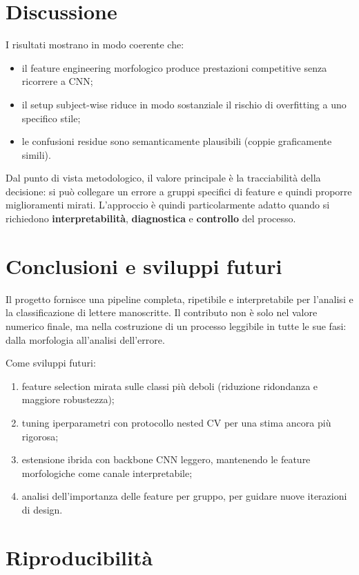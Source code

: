 \documentclass[a4paper,12pt]{article}
\begin{document}
\section{Discussione}
I risultati mostrano in modo coerente che:
\begin{itemize}[leftmargin=1.5em]
  \item il feature engineering morfologico produce prestazioni competitive senza ricorrere a CNN;
  \item il setup subject-wise riduce in modo sostanziale il rischio di overfitting a uno specifico stile;
  \item le confusioni residue sono semanticamente plausibili (coppie graficamente simili).
\end{itemize}

Dal punto di vista metodologico, il valore principale è la tracciabilità della decisione:
si può collegare un errore a gruppi specifici di feature e quindi proporre miglioramenti mirati.
L'approccio è quindi particolarmente adatto quando si richiedono \textbf{interpretabilità}, \textbf{diagnostica} e \textbf{controllo} del processo.

\section{Conclusioni e sviluppi futuri}
Il progetto fornisce una pipeline completa, ripetibile e interpretabile per l'analisi e la classificazione di lettere manoscritte.
Il contributo non è solo nel valore numerico finale, ma nella costruzione di un processo leggibile in tutte le sue fasi: dalla morfologia all'analisi dell'errore.

Come sviluppi futuri:
\begin{enumerate}[leftmargin=1.5em]
  \item feature selection mirata sulle classi più deboli (riduzione ridondanza e maggiore robustezza);
  \item tuning iperparametri con protocollo nested CV per una stima ancora più rigorosa;
  \item estensione ibrida con backbone CNN leggero, mantenendo le feature morfologiche come canale interpretabile;
  \item analisi dell'importanza delle feature per gruppo, per guidare nuove iterazioni di design.
\end{enumerate}

\appendix
\section{Riproducibilità}
\end{document}
